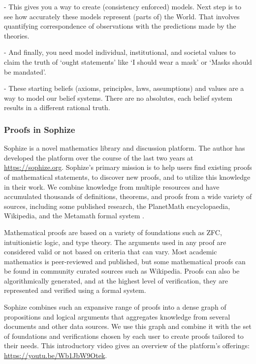 \documentclass[a4paper]{article}
\begin{document}
- This gives you a way to create (consistency enforced) models. Next step is to see how accurately these models represent (parts of) the World. That involves quantifying correspondence of observations with the predictions made by the theories.

- And finally, you need model individual, institutional, and societal values to claim the truth of `ought statements' like `I should wear a mask' or `Masks should be mandated'.

- These starting beliefs (axioms, principles, laws, assumptions) and values are a way to model our belief systems. There are no absolutes, each belief system results in a different rational truth.



\subsubsection*{Proofs in Sophize}
Sophize is a novel mathematics library and discussion platform. The author has developed the platform over the course of the last two years at \url{https://sophize.org}. Sophize's primary mission is to help users find existing proofs of mathematical statements, to discover new proofs, and to utilize this knowledge in their work. We combine knowledge from multiple resources and have accumulated thousands of definitions, theorems, and proofs from a wide variety of sources, including some published research, the PlanetMath encyclopaedia, Wikipedia, and the Metamath formal system \cite{metamath}.


Mathematical proofs are based on a variety of foundations such as ZFC, intuitionistic logic, and type theory. The arguments used in any proof are considered valid or not based on criteria that can vary. Most academic mathematics is peer-reviewed and published, but some mathematical proofs can be found in community curated sources such as Wikipedia. Proofs can also be algorithmically generated, and at the highest level of verification, they are represented and verified using a formal system. 

Sophize combines such an expansive range of proofs into a dense graph of propositions and logical arguments that aggregates knowledge from several documents and other data sources. We use this graph and combine it with the set of foundations and verifications chosen by each user to create proofs tailored to their needs. This introductory video gives an overview of the platform's offerings: \url{https://youtu.be/Wb1JbW9Otek}.
	
\end{document}
